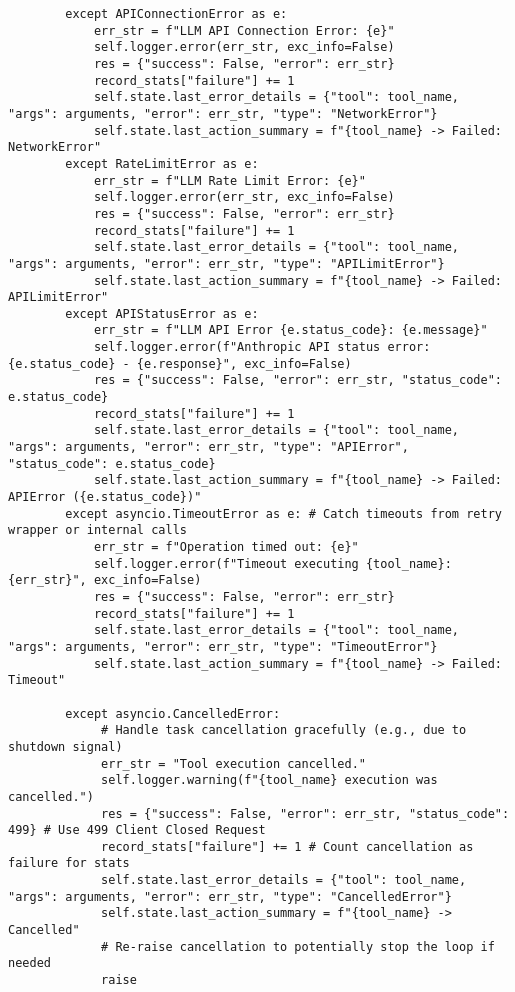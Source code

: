 \documentclass[12pt,a4paper]{article}
\begin{document}
\begin{pageablecode}
\begin{verbatim}
        except APIConnectionError as e:
            err_str = f"LLM API Connection Error: {e}"
            self.logger.error(err_str, exc_info=False)
            res = {"success": False, "error": err_str}
            record_stats["failure"] += 1
            self.state.last_error_details = {"tool": tool_name, "args": arguments, "error": err_str, "type": "NetworkError"}
            self.state.last_action_summary = f"{tool_name} -> Failed: NetworkError"
        except RateLimitError as e:
            err_str = f"LLM Rate Limit Error: {e}"
            self.logger.error(err_str, exc_info=False)
            res = {"success": False, "error": err_str}
            record_stats["failure"] += 1
            self.state.last_error_details = {"tool": tool_name, "args": arguments, "error": err_str, "type": "APILimitError"}
            self.state.last_action_summary = f"{tool_name} -> Failed: APILimitError"
        except APIStatusError as e:
            err_str = f"LLM API Error {e.status_code}: {e.message}"
            self.logger.error(f"Anthropic API status error: {e.status_code} - {e.response}", exc_info=False)
            res = {"success": False, "error": err_str, "status_code": e.status_code}
            record_stats["failure"] += 1
            self.state.last_error_details = {"tool": tool_name, "args": arguments, "error": err_str, "type": "APIError", "status_code": e.status_code}
            self.state.last_action_summary = f"{tool_name} -> Failed: APIError ({e.status_code})"
        except asyncio.TimeoutError as e: # Catch timeouts from retry wrapper or internal calls
            err_str = f"Operation timed out: {e}"
            self.logger.error(f"Timeout executing {tool_name}: {err_str}", exc_info=False)
            res = {"success": False, "error": err_str}
            record_stats["failure"] += 1
            self.state.last_error_details = {"tool": tool_name, "args": arguments, "error": err_str, "type": "TimeoutError"}
            self.state.last_action_summary = f"{tool_name} -> Failed: Timeout"

        except asyncio.CancelledError:
             # Handle task cancellation gracefully (e.g., due to shutdown signal)
             err_str = "Tool execution cancelled."
             self.logger.warning(f"{tool_name} execution was cancelled.")
             res = {"success": False, "error": err_str, "status_code": 499} # Use 499 Client Closed Request
             record_stats["failure"] += 1 # Count cancellation as failure for stats
             self.state.last_error_details = {"tool": tool_name, "args": arguments, "error": err_str, "type": "CancelledError"}
             self.state.last_action_summary = f"{tool_name} -> Cancelled"
             # Re-raise cancellation to potentially stop the loop if needed
             raise


\end{verbatim}
\end{pageablecode}
\end{document}
